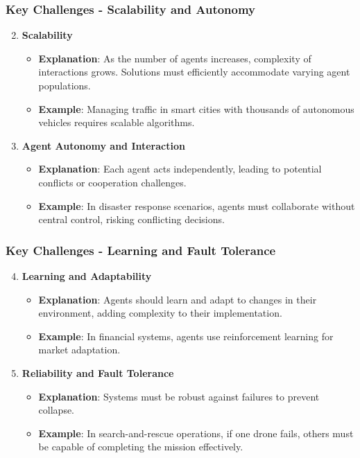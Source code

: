 \documentclass[aspectratio=169]{beamer}
\begin{document}
\begin{frame}[fragile]
    \frametitle{Key Challenges - Scalability and Autonomy}
    \begin{enumerate}
        \setcounter{enumi}{1}
        \item \textbf{Scalability}
            \begin{itemize}
                \item \textbf{Explanation}: As the number of agents increases, complexity of interactions grows. Solutions must efficiently accommodate varying agent populations.
                \item \textbf{Example}: Managing traffic in smart cities with thousands of autonomous vehicles requires scalable algorithms.
            \end{itemize}
        
        \item \textbf{Agent Autonomy and Interaction}
            \begin{itemize}
                \item \textbf{Explanation}: Each agent acts independently, leading to potential conflicts or cooperation challenges.
                \item \textbf{Example}: In disaster response scenarios, agents must collaborate without central control, risking conflicting decisions.
            \end{itemize}
    \end{enumerate}
\end{frame}

\begin{frame}[fragile]
    \frametitle{Key Challenges - Learning and Fault Tolerance}
    \begin{enumerate}
        \setcounter{enumi}{3}
        \item \textbf{Learning and Adaptability}
            \begin{itemize}
                \item \textbf{Explanation}: Agents should learn and adapt to changes in their environment, adding complexity to their implementation.
                \item \textbf{Example}: In financial systems, agents use reinforcement learning for market adaptation.
            \end{itemize}

        \item \textbf{Reliability and Fault Tolerance}
            \begin{itemize}
                \item \textbf{Explanation}: Systems must be robust against failures to prevent collapse.
                \item \textbf{Example}: In search-and-rescue operations, if one drone fails, others must be capable of completing the mission effectively.
            \end{itemize}
    \end{enumerate}
\end{frame}
\end{document}
